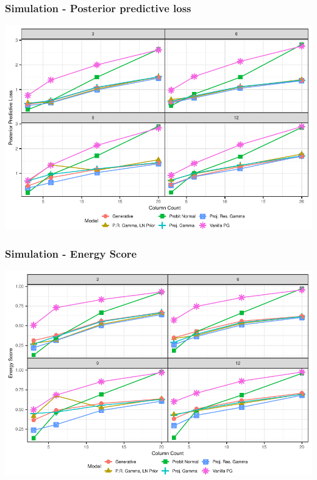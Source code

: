 \documentclass[aspectratio=169]{beamer}
\begin{document}
\begin{frame}
  \frametitle{Simulation - Posterior predictive loss}
  \begin{center}
    \includegraphics[width=0.9\linewidth]{./images/simulation_ppl}
  \end{center}
\end{frame}

\begin{frame}
  \frametitle{Simulation - Energy Score}
  \begin{center}
    \includegraphics[width=0.9\linewidth]{./images/simulation_es}
  \end{center}
\end{frame}
\end{document}
